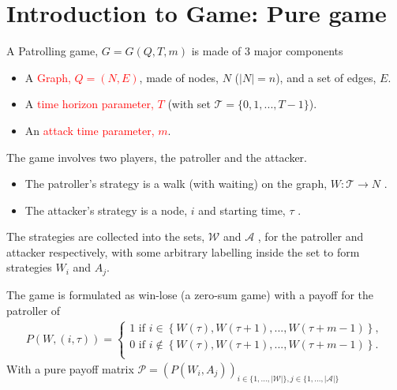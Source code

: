 \documentclass[11pt]{beamer}
\begin{document}
\section[]{Introduction to Game: Pure game}
\hypertarget{Introduction to game: Pure game}{}
\begin{frame}{\insertsection}

A Patrolling game, $G=G(Q,T,m)$ is made of 3 major components
\begin{itemize}
\item A \textcolor{red}{Graph, $Q=(N,E)$}, made of nodes, $N$ ($|N|=n$), and a set of edges, $E$.
\item A \textcolor{red}{time horizon parameter, $T$} (with set $\mathcal{T}=\{0,1,...,T-1\}$).
\item An \textcolor{red}{attack time parameter, $m$}.
\end{itemize}

\pause

The game involves two players, the patroller and the attacker.
\begin{itemize}
\item The patroller's strategy is a walk (with waiting) on the graph, $W:\mathcal{T} \rightarrow  N$ .
\item The attacker's strategy is a node, $i$ and starting time, $\tau$ .
\end{itemize} 
The strategies are collected into the sets, $\mathcal{W}$ and $\mathcal{A}$ , for the patroller and attacker respectively, with some arbitrary labelling inside the set to form strategies $W_{i}$ and $A_{j}$.

\end{frame}

\begin{frame}{\insertsection}
The game is formulated as win-lose (a zero-sum game) with a payoff for the patroller of
\begin{align*}
P(W,(i,\tau))=\left\{ \begin{array}{l}
1 \text{  if  } i \in \left\{ W(\tau),W(\tau+1),...,W(\tau+m-1) \right\} ,\\
0 \text{  if  } i \notin \left\{ W(\tau),W(\tau+1),...,W(\tau+m-1) \right\} .\\
\end{array}\right.
\end{align*}
With a pure payoff matrix $\mathcal{P}=(P(W_{i},A_{j}))_{i \in \{ 1,...,|\mathcal{W}| \}, j \in \{ 1,...,|\mathcal{A}| \}}$
\end{frame}
\end{document}
